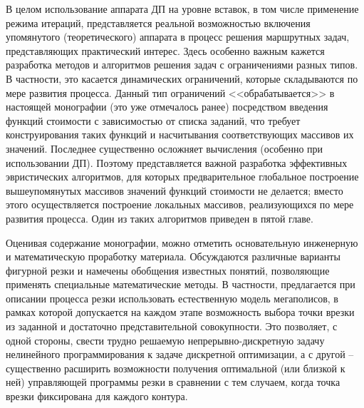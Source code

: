 \documentclass[11pt,twoside,openany]{report}
\begin{document}
В целом использование аппарата ДП
на уровне вставок,
в том числе применение режима итераций,
представляется реальной возможностью включения упомянутого
(теоретического) аппарата в процесс решения маршрутных задач,
представляющих практический интерес.
Здесь особенно важным кажется
разработка методов и алгоритмов решения задач с ограничениями разных типов.
В частности, это касается динамических ограничений,
которые складываются по мере развития процесса.
Данный тип ограничений <<обрабатывается>> в настоящей монографии
(это уже отмечалось ранее)
посредством введения функций стоимости с зависимостью от списка заданий,
что требует конструирования таких функций
и насчитывания соответствующих массивов их значений.
Последнее существенно осложняет вычисления
(особенно при использовании ДП).
Поэтому представляется важной разработка
эффективных эвристических алгоритмов,
для которых предварительное глобальное построение
вышеупомянутых массивов значений функций стоимости не делается;
вместо этого осуществляется построение локальных массивов,
реализующихся по мере развития процесса.
Один из таких алгоритмов приведен в пятой главе.

Оценивая содержание монографии,
можно отметить основательную инженерную и математическую проработку материала.
Обсуждаются различные варианты фигурной резки и
намечены обобщения известных понятий,
позволяющие применять специальные математические методы.
В частности, предлагается при описании процесса резки
использовать естественную модель мегаполисов,
в рамках которой допускается на каждом этапе
возможность выбора точки врезки из заданной
и достаточно представительной совокупности.
Это позволяет, с одной стороны,
свести трудно
решаемую непрерывно-дискретную задачу нелинейного программирования
к задаче дискретной оптимизации, а с другой --
существенно расширить возможности получения оптимальной
(или близкой к ней)
управляющей программы резки в сравнении
с тем случаем,
когда точка врезки фиксирована для каждого контура.
\end{document}
